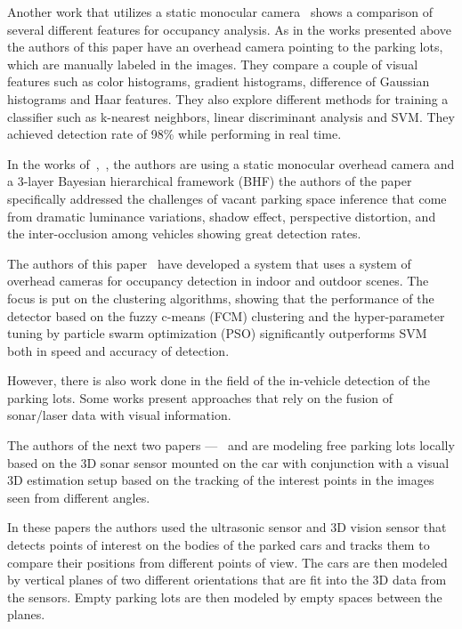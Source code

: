 Another work that utilizes a static monocular camera~\cite{tschentscher} shows a
comparison of several different features for occupancy analysis. As in the works
presented above the authors of this paper have an overhead camera pointing to
the parking lots, which are manually labeled in the images. They compare a
couple of visual features such as color histograms, gradient histograms,
difference of Gaussian histograms and Haar features. They also explore different
methods for training a classifier such as k-nearest neighbors, linear
discriminant analysis and SVM. They achieved detection rate of 98\% while
performing in real time.

In the works of~\cite{chingchun10},~\cite{chingjao10}, the authors are using a
static monocular overhead camera and a 3-layer Bayesian hierarchical framework
 (BHF) the authors of the paper specifically addressed the challenges of vacant
parking space inference that come from dramatic luminance variations, shadow
effect, perspective distortion, and the inter-occlusion among vehicles showing
great detection rates.

The authors of this paper~\cite{ichihashi} have developed a system that uses a
system of overhead cameras for occupancy detection in indoor and outdoor
scenes. The focus is put on the clustering algorithms, showing that the
performance of the detector based on the fuzzy c-means (FCM) clustering and
the hyper-parameter tuning by particle swarm optimization (PSO) significantly
outperforms SVM both in speed and accuracy of detection.

However, there is also work done in the field of the in-vehicle detection of
the parking lots. Some works present approaches that rely on the fusion of
sonar/laser data with visual information.

The authors of the next two papers ---~\cite{fintyelvestri} and
\cite{abadvestri} are modeling free parking lots locally based on the 3D sonar
sensor mounted on the car with conjunction with a visual 3D estimation setup
based on the tracking of the interest points in the images seen from different
angles.

In these papers the authors used the ultrasonic sensor and 3D vision sensor
that detects points of interest on the bodies of the parked cars and tracks
them to compare their positions from different points of view. The cars are
then modeled by vertical planes of two different orientations that are fit
into the 3D data from the sensors. Empty parking lots are then modeled by
empty spaces between the planes.

